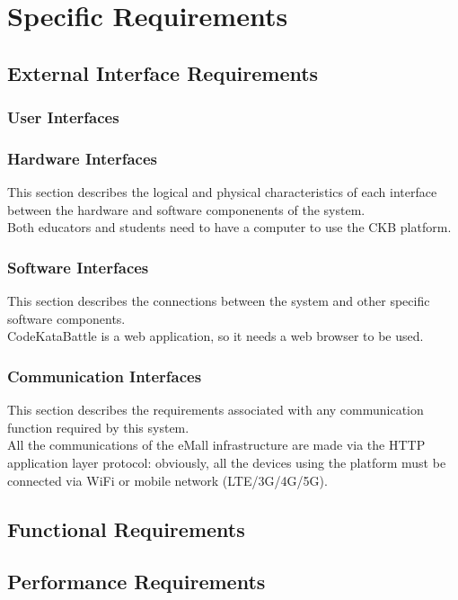 \chapter{Specific Requirements}

\section{External Interface Requirements}
\subsection{User Interfaces}
\subsection{Hardware Interfaces}
This section describes the logical and physical characteristics of each interface 
between the hardware and software componenents of the system.\\
Both educators and students need to have a computer to use the CKB platform.\\
\subsection{Software Interfaces}
This section describes the connections between the system and other specific software components.\\
CodeKataBattle is a web application, so it needs a web browser to be used.\\
\subsection{Communication Interfaces}
This section describes the requirements associated with any communication function required
by this system.\\
All the communications of the eMall infrastructure are made via the HTTP application layer
protocol: obviously, all the devices using the platform must be connected via WiFi or mobile
network (LTE/3G/4G/5G).\\
\section{Functional Requirements}

\section{Performance Requirements}

